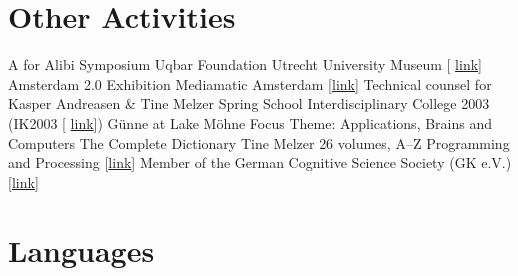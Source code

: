 \documentclass[11pt,a4paper]{moderncv}
\begin{document}
\section{Other Activities}
        {A for Alibi Symposium}
        {}
        {Uqbar Foundation}
        {Utrecht University Museum [%
        \href{http://www.sternbergpress.com/?pageId=1204}{link}]}
        {}	
        {Amsterdam 2.0 Exhibition}
        {}
        {Mediamatic}
        {Amsterdam [\href{http://www.mediamatic.net/artefact-9850-en.html}%
        {link}]}
        {Technical counsel for Kasper Andreasen \& Tine Melzer}
        {Spring School}
        {}
        {Interdisciplinary College 2003 (IK2003 [%
        \href{http://www.ik-guenne.de/html/ik2003.html}{link}])}
        {G\"{u}nne at Lake M\"{o}hne}
        {Focus Theme: Applications, Brains and Computers}
        {The Complete Dictionary}
        {}
        {Tine Melzer}
        {26 volumes, A--Z}
        {Programming and Processing
        [\href{http://www.tinemelzer.eu/works/the-complete-dictionary/}
        {link}]}
        {Member of the German Cognitive Science Society (GK e.V.)}
        {}
        {}
        {[\href{http://www.gk-ev.de}{link}]}
        {}
\closesection{}


\section{Languages}
\closesection{}


\end{document}
